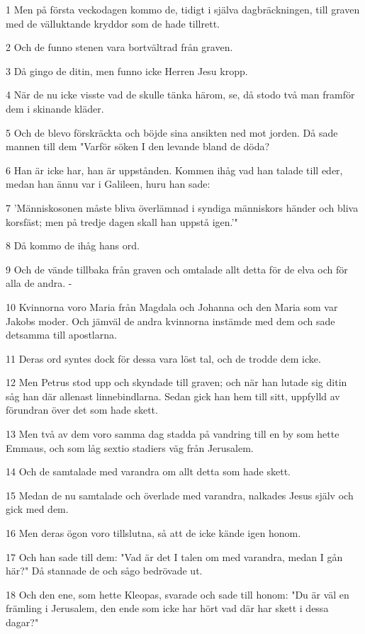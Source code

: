 \par 1 Men på första veckodagen kommo de, tidigt i själva dagbräckningen, till graven med de välluktande kryddor som de hade tillrett.
\par 2 Och de funno stenen vara bortvältrad från graven.
\par 3 Då gingo de ditin, men funno icke Herren Jesu kropp.
\par 4 När de nu icke visste vad de skulle tänka härom, se, då stodo två man framför dem i skinande kläder.
\par 5 Och de blevo förskräckta och böjde sina ansikten ned mot jorden. Då sade mannen till dem "Varför söken I den levande bland de döda?
\par 6 Han är icke har, han är uppstånden. Kommen ihåg vad han talade till eder, medan han ännu var i Galileen, huru han sade:
\par 7 'Människosonen måste bliva överlämnad i syndiga människors händer och bliva korsfäst; men på tredje dagen skall han uppstå igen.'"
\par 8 Då kommo de ihåg hans ord.
\par 9 Och de vände tillbaka från graven och omtalade allt detta för de elva och för alla de andra. -
\par 10 Kvinnorna voro Maria från Magdala och Johanna och den Maria som var Jakobs moder. Och jämväl de andra kvinnorna instämde med dem och sade detsamma till apostlarna.
\par 11 Deras ord syntes dock för dessa vara löst tal, och de trodde dem icke.
\par 12 Men Petrus stod upp och skyndade till graven; och när han lutade sig ditin såg han där allenast linnebindlarna. Sedan gick han hem till sitt, uppfylld av förundran över det som hade skett.
\par 13 Men två av dem voro samma dag stadda på vandring till en by som hette Emmaus, och som låg sextio stadiers väg från Jerusalem.
\par 14 Och de samtalade med varandra om allt detta som hade skett.
\par 15 Medan de nu samtalade och överlade med varandra, nalkades Jesus själv och gick med dem.
\par 16 Men deras ögon voro tillslutna, så att de icke kände igen honom.
\par 17 Och han sade till dem: "Vad är det I talen om med varandra, medan I gån här?" Då stannade de och sågo bedrövade ut.
\par 18 Och den ene, som hette Kleopas, svarade och sade till honom: "Du är väl en främling i Jerusalem, den ende som icke har hört vad där har skett i dessa dagar?"
